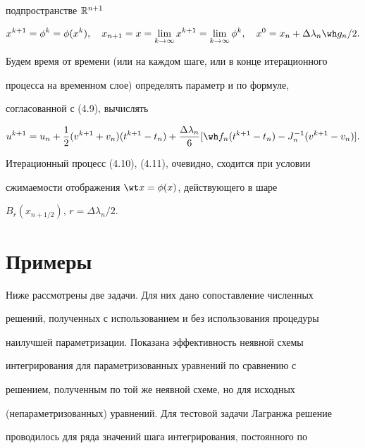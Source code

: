 подпространстве $\Bbb R^{n+1}$ 


\begin{equation} 


x^{k+1}=\phi^k=\phi(x^k),\quad x_{n+1}=x=\lim_{k\to\infty}x^{k+1}= 


\lim_{k\to\infty}\phi^k,\quad x^0=x_n+\Delta\lambda_n\wh g_n/2. 


\end{equation} 


Будем время от времени (или на каждом шаге, или в конце итерационного 


процесса на временном слое) определять параметр и по формуле, 


согласованной с (4.9), вычислять


\begin{equation} 


u^{k+1}=u_n+\frac{1}{2}(v^{k+1}+v_n)(t^{k+1}-t_n)+ 


\frac{\Delta\lambda_n}{6}[\wh f_n(t^{k+1}-t_n)-J^{-1}_n 


(v^{k+1}-v_n)]. 


\end{equation} 


Итерационный процесс (4.10), (4.11), очевидно, сходится при условии 


сжимаемости отображения $\wt x=\phi(x)$, действующего в шаре 


$B_r(x_{n+1/2})$, $r=\Delta\lambda_n/2$. 


 


\section{Примеры} 


 


Ниже рассмотрены две задачи. Для них дано сопоставление численных 


решений, полученных с использованием и без использования процедуры 


наилучшей параметризации. Показана эффективность неявной схемы 


интегрирования для параметризованных уравнений по сравнению с 


решением, полученным по той же неявной схеме, но для исходных 


(непараметризованных) уравнений. Для тестовой задачи Лагранжа решение 


проводилось для ряда значений шага интегрирования, постоянного по 


